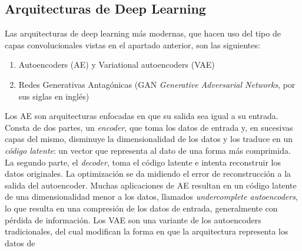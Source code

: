 \documentclass[12pt, spanish]{article}
\begin{document}

\clearpage

\subsection{Arquitecturas de Deep Learning} %
Las arquitecturas de deep learning más modernas, que hacen uso del tipo
de capas convolucionales vistas en el apartado anterior, son las siguientes:
\begin{enumerate}
    \item Autoencoders (AE) \cite[p.~517]{goodfellow2016deep} y
        Variational autoencoders (VAE) \cite{Kingma2013}
    \item Redes Generativas Antagónicas (GAN \textit{Generative
        Adversarial Networks}, por sus siglas en inglés)
\end{enumerate}
Los AE son arquitecturas enfocadas en que su salida sea igual a su
entrada. Consta de dos partes, un \textit{encoder}, que toma los datos
de entrada y, en sucesivas capas del mismo, disminuye la dimensionalidad
de los datos y los traduce en un \textit{código latente}: un vector que
representa al dato de una forma más comprimida. La segundo parte, el
\textit{decoder}, toma el código latente e intenta reconstruir los datos
originales. La optimización se da midiendo el error de reconstrucción
a la salida del autoencoder. Muchas aplicaciones de AE resultan en un
código latente de una dimensionalidad menor a los datos, llamados
\textit{undercomplete autoencoders}, lo que resulta en una compresión
de los datos de entrada, generalmente con pérdida de información. 
Los VAE son una variante de los autoencoders tradicionales, del cual
modifican la forma en que la arquitectura representa los datos de 
\end{document}
